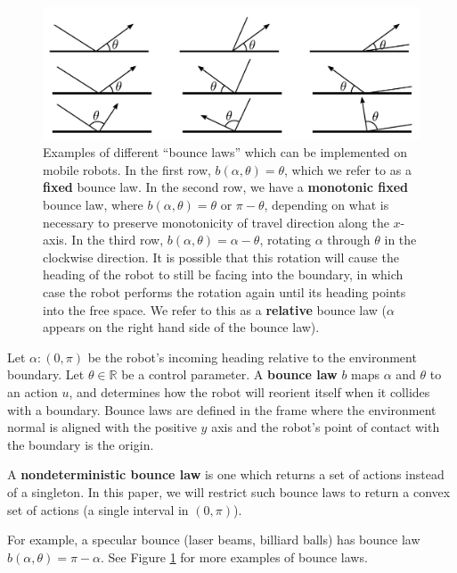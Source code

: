 \documentclass[]{styles/svproc}  %
\begin{document}
\begin{figure}
    \includegraphics[width=0.8\linewidth]{figures/bounce_examples.pdf}
    \centering
    \caption[test]{\label{fig:bex}Examples of different ``bounce laws'' which can be implemented on
mobile robots. In the first row, $b(\alpha, \theta) = \theta$, which we refer to
as a \textbf{fixed} bounce law. In the second row, we have a \textbf{monotonic
fixed} bounce law, where
$b(\alpha, \theta) = \theta$ or $\pi-\theta$, depending on what is necessary to
preserve monotonicity of travel direction along the $x$-axis. In the third
row, $b(\alpha, \theta) = \alpha - \theta$, rotating $\alpha$ through $\theta$ in the clockwise
direction. It is possible that this rotation will cause the 
heading of the robot to still be facing into the boundary, in which case the robot 
performs the rotation again until its heading points into the free space. We
refer to this as a \textbf{relative} bounce law ($\alpha$ appears on the
right hand side of the bounce law).
}
\end{figure}

\begin{definition}
Let $\alpha: (0,\pi)$ be the robot's incoming heading relative to the
environment boundary. Let $\theta \in \mathbb{R}$ be a control parameter. A 
\textbf{bounce law} $b$ maps $\alpha$ and $\theta$ to an action
$u$, and determines how the robot will reorient itself when it collides with a
boundary. Bounce laws are defined in the
frame where the environment normal is aligned with the positive $y$ axis and the
robot's point of contact with the boundary is the origin.
\end{definition}

\begin{definition}
A \textbf{nondeterministic bounce law} is one which returns a set of actions
instead of a singleton. In this paper, we will restrict such bounce laws to
return a convex set of actions (a single interval in $(0, \pi)$).
\end{definition}

For example, a specular bounce (laser beams, billiard balls) has bounce law
$b(\alpha, \theta) = \pi - \alpha$. See Figure \ref{fig:bex} for more
examples of bounce laws. 
\end{document}
